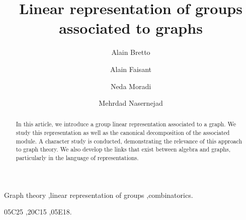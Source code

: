 \documentclass[preprint,12pt,authoryear]{elsarticle}
\theoremstyle{definition}
\begin{document}
\begin{frontmatter}

\title{Linear  representation of groups  associated to graphs}

\author[A]{Alain Bretto}
\author[B]{Alain Faisant}
\author[A,C]{Neda Moradi}
\author[A,D]{Mehrdad Nasernejad}
\address[A]{Normandie Univ-Caen, GREYC CNRS UMR-6072, Campus II, Bd Marechal Juin BP 5186, 14032 Caen cedex 5, France}
\address[B]{Univ Lyon, UJM-Saint-\'Etienne, CNRS, ICJ UMR 5208, 42023 Saint-\'Etienne, France}
\address[C]{University of Kashan, Faculty of Mathematical Sciences, Kashan, Iran}
\address[D]{Univ. Artois, UR 2462, Laboratoire de Math\'ematique de Lens (LML), F-62300 Lens, France}

\begin{abstract}
In this article, we introduce a group  linear representation associated to a graph. 
We study this representation as well as the canonical decomposition of the associated module. A character study is conducted, demonstrating the relevance of this approach to graph theory.  We also develop the links that exist between algebra and graphs, particularly in the language of representations.

\end{abstract}


\begin{keyword}
Graph theory \sep linear representation of groups \sep combinatorics.

\MSC[2020] 05C25 \sep 20C15 \sep 05E18.
\end{keyword}



 \end{frontmatter}

\end{document}
